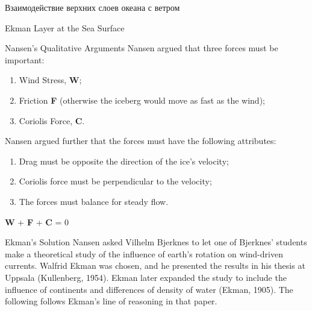 \begin{chapter}{Взаимодействие верхних слоев океана с ветром}
\begin{section}{Ekman Layer at the Sea Surface}
\begin{paragraph}{Nansen's Qualitative Arguments}
Nansen argued that three forces must be important:
\begin{enumerate}
\item Wind Stress, \textbf{W};
%

\item 
Friction \textbf{F} (otherwise the iceberg would move as fast as the
wind);
%

\item 
Coriolis Force, \textbf{C}.
%
\end{enumerate}
Nansen argued further that the forces must have the following
attributes:
%
\begin{enumerate}
\item 
Drag must be opposite the direction of the ice's velocity;
%

\item 
Coriolis force must be perpendicular to the velocity;
%

\item 
The forces must balance for steady flow.  
%
\end{enumerate}
\begin{center}
\textbf{W} + \textbf{F} + \textbf{C} = 0
\end{center}
\end{paragraph}

\begin{paragraph}{Ekman's Solution}
Nansen asked Vilhelm Bjerknes to let one
of Bjerknes' students make a theoretical study of the influence of
earth's rotation on wind-driven currents. Walfrid Ekman was chosen,
and he presented the results in his thesis at Uppsala (Kullenberg,
1954). Ekman later expanded the study to include the influence of
continents and differences of density of water (Ekman, 1905). The
following follows Ekman's line of reasoning in that paper.
%


\end{paragraph}
\end{section}
\end{chapter}

